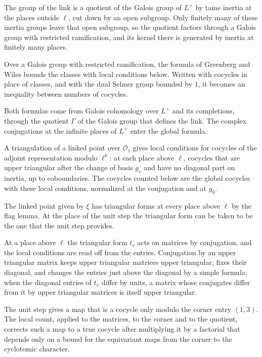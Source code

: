 The group of the link is a quotient of the Galois group of $L^+$ by tame inertia at the places outside $\ell$, cut down by an open subgroup. Only finitely many of these inertia groups leave that open subgroup, so the quotient factors through a Galois group with restricted ramification, and its kernel there is generated by inertia at finitely many places.

Over a Galois group with restricted ramification, the formula of Greenberg and Wiles bounds the classes with local conditions below. Written with cocycles in place of classes, and with the dual Selmer group bounded by $1$, it becomes an inequality between numbers of cocycles.

Both formulas come from Galois cohomology over $L^+$ and its completions, through the quotient $\Gamma$ of the Galois group that defines the link. The complex conjugations at the infinite places of $L^+$ enter the global formula.

A triangulation of a linked point over $\mathcal O_1$ gives local conditions for cocycles of the adjoint representation modulo $\ell^k$: at each place above $\ell$, cocycles that are upper triangular after the change of basis $g_v$ and have no diagonal part on inertia, up to coboundaries. The cocycles counted below are the global cocycles with these local conditions, normalized at the conjugation and at $g_0$.

The linked point given by $\xi$ has triangular forms at every place above $\ell$ by the flag lemma. At the place of the unit step the triangular form can be taken to be the one that the unit step provides.

At a place above $\ell$ the triangular form $t_v$ acts on matrices by conjugation, and the local conditions are read off from the entries. Conjugation by an upper triangular matrix keeps upper triangular matrices upper triangular, fixes their diagonal, and changes the entries just above the diagonal by a simple formula; when the diagonal entries of $t_v$ differ by units, a matrix whose conjugates differ from it by upper triangular matrices is itself upper triangular.

The unit step gives a map that is a cocycle only modulo the corner entry $(1,3)$. The local count, applied to the matrices, to the corner and to the quotient, corrects such a map to a true cocycle after multiplying it by a factorial that depends only on a bound for the equivariant maps from the corner to the cyclotomic character.

